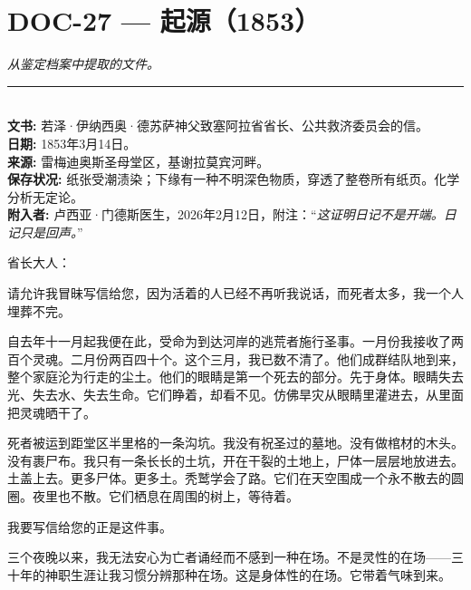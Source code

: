 \section*{\textbf{DOC-27} --- 起源（1853）}

\noindent \textit{从鉴定档案中提取的文件。}

\vspace{0.5em}\noindent\rule{\textwidth}{0.5pt}\vspace{0.5em}


\\[-0.2em]

\noindent\textbf{文书:} 若泽·伊纳西奥·德苏萨神父致塞阿拉省省长、公共救济委员会的信。\\
\noindent\textbf{日期:} 1853年3月14日。\\
\noindent\textbf{来源:} 雷梅迪奥斯圣母堂区，基谢拉莫宾河畔。\\
\noindent\textbf{保存状况:} 纸张受潮渍染；下缘有一种不明深色物质，穿透了整卷所有纸页。化学分析无定论。\\
\noindent\textbf{附入者:} 卢西亚·门德斯医生，2026年2月12日，附注：\textquotedblleft{\textit{这证明日记不是开端。日记只是回声。}\textquotedblright{}}

\noindent 省长大人：

\noindent 请允许我冒昧写信给您，因为活着的人已经不再听我说话，而死者太多，我一个人埋葬不完。

\noindent 自去年十一月起我便在此，受命为到达河岸的逃荒者施行圣事。一月份我接收了两百个灵魂。二月份两百四十个。这个三月，我已数不清了。他们成群结队地到来，整个家庭沦为行走的尘土。他们的眼睛是第一个死去的部分。先于身体。眼睛失去光、失去水、失去生命。它们睁着，却看不见。仿佛旱灾从眼睛里灌进去，从里面把灵魂晒干了。

\noindent 死者被运到距堂区半里格的一条沟坑。我没有祝圣过的墓地。没有做棺材的木头。没有裹尸布。我只有一条长长的土坑，开在干裂的土地上，尸体一层层地放进去。土盖上去。更多尸体。更多土。秃鹫学会了路。它们在天空围成一个永不散去的圆圈。夜里也不散。它们栖息在周围的树上，等待着。

\noindent 我要写信给您的正是这件事。

\noindent 三个夜晚以来，我无法安心为亡者诵经而不感到一种在场。不是灵性的在场——三十年的神职生涯让我习惯分辨那种在场。这是身体性的在场。它带着气味到来。

